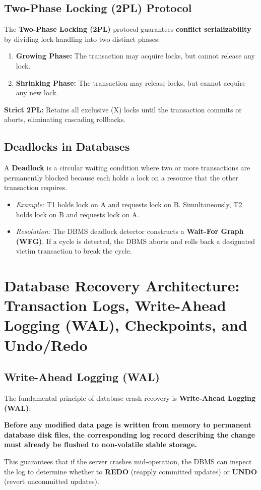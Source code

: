 \subsection{Two-Phase Locking (2PL) Protocol}

The \textbf{Two-Phase Locking (2PL)} protocol guarantees \textbf{conflict serializability} by dividing lock handling into two distinct phases:
\begin{enumerate}
\item \textbf{Growing Phase:} The transaction may acquire locks, but cannot release any lock.
\item \textbf{Shrinking Phase:} The transaction may release locks, but cannot acquire any new lock.
\end{enumerate}
\textbf{Strict 2PL:} Retains all exclusive (X) locks until the transaction commits or aborts, eliminating cascading rollbacks.

\subsection{Deadlocks in Databases}

A \textbf{Deadlock} is a circular waiting condition where two or more transactions are permanently blocked because each holds a lock on a resource that the other transaction requires.
\begin{itemize}
\item \textit{Example:} T1 holds lock on A and requests lock on B. Simultaneously, T2 holds lock on B and requests lock on A.
\item \textit{Resolution:} The DBMS deadlock detector constructs a \textbf{Wait-For Graph (WFG)}. If a cycle is detected, the DBMS aborts and rolls back a designated victim transaction to break the cycle.
\end{itemize}

\newpage
\section{Database Recovery Architecture: Transaction Logs, Write-Ahead Logging (WAL), Checkpoints, and Undo/Redo}

\subsection{Write-Ahead Logging (WAL)}

The fundamental principle of database crash recovery is \textbf{Write-Ahead Logging (WAL)}:
\begin{tcolorbox}[colback=white,colframe=black,title=\textbf{The WAL Invariant Rule}]
\textbf{Before any modified data page is written from memory to permanent database disk files, the corresponding log record describing the change must already be flushed to non-volatile stable storage.}
\end{tcolorbox}
This guarantees that if the server crashes mid-operation, the DBMS can inspect the log to determine whether to \textbf{REDO} (reapply committed updates) or \textbf{UNDO} (revert uncommitted updates).

